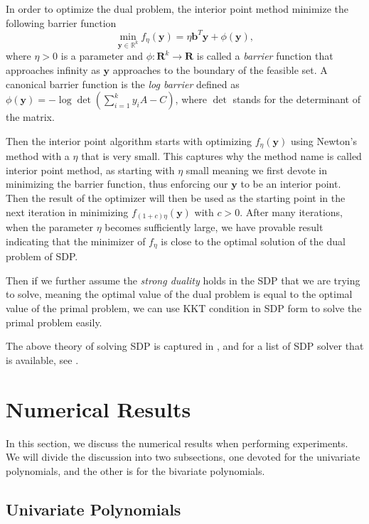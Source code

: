 \documentclass[12pt]{amsart}
\numberwithin{equation}{section}
\theoremstyle{definition}
\numberwithin{thm}{section}
\begin{document}
In order to optimize the dual problem, the interior point method minimize the following barrier function 
\begin{equation*}
     \min_{\mathbf{y} \in \mathbb{R}^k} f_\eta(\mathbf{y}) = \eta \mathbf{b}^T\mathbf{y} + \phi(\mathbf{y}),
\end{equation*}
where $\eta > 0$ is a parameter and $\phi \colon \mathbf{R}^k \to \mathbf{R}$ is called a \emph{barrier} function that approaches infinity as $\mathbf{y}$ 
approaches to the boundary of the feasible set. 
A canonical barrier function is the \emph{log barrier} defined as $\phi(\mathbf{y}) = - \log \det(\sum_{i = 1}^k y_i A - C)$, where $\det$ stands for the determinant of the matrix.  

Then the interior point algorithm starts with optimizing $f_\eta(\mathbf{y})$ using Newton's method with a $\eta$ that is very small. 
This captures why the method name is called interior point method, as starting with $\eta$ small meaning we first
devote in minimizing the barrier function, thus enforcing our $\mathbf{y}$ to be an interior point. 
Then the result of the optimizer will then be used as the starting point in the next iteration in minimizing 
$f_{(1+c)\eta}(\mathbf{y})$ with $c > 0$. After many iterations, when the parameter $\eta$ becomes sufficiently large,
we have provable result indicating that the minimizer of $f_\eta$ is close to the optimal solution of the dual problem of SDP.

Then if we further assume the \emph{strong duality} holds in the SDP that we are trying to solve, meaning
the optimal value of the dual problem is equal to the optimal value of the primal problem, we can use KKT condition in 
SDP form to solve the primal problem easily. 

The above theory of solving SDP is captured in \cite{boyd2004convex}, and for a list of SDP solver that is available, see \cite[Chapter 2.2]{Blekherman:Parrilo:Thomas}. 


\newpage
\section{Numerical Results}
\label{Sec: Num Results}

In this section, we discuss the numerical results when performing experiments. 
We will divide the discussion into two subsections, one devoted for the univariate polynomials, 
and the other is for the bivariate polynomials. 

\subsection{Univariate Polynomials}
\end{document}
